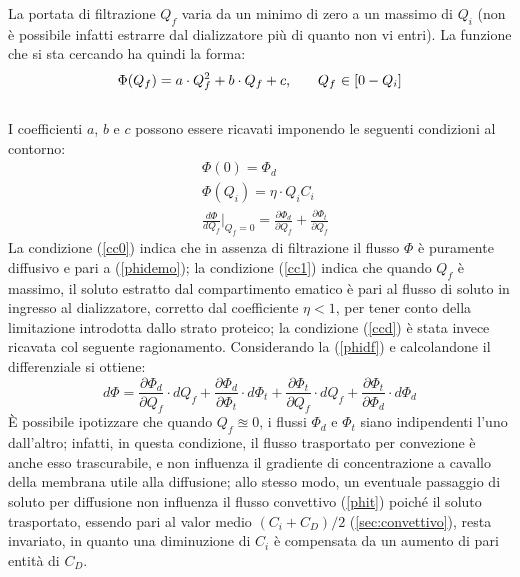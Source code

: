 La portata di filtrazione $Q_f$ varia da un minimo di zero a un massimo di $Q_i$ (non è possibile infatti estrarre dal dializzatore più di quanto non vi entri). La funzione che si sta cercando ha quindi la forma:
\begin{equation}\label{phi}
		\Phi(Q_f) = a\cdot Q_f^2 + b\cdot Q_f + c  \text{,\qquad$Q_f$ $\in[0-Q_i]$}
\end{equation}\\
I coefficienti $a$, $b$ e $c$ possono essere ricavati imponendo le seguenti condizioni al contorno:
\begin{subequations}\label{cc}
	\begin{align}
		&\Phi(0)=\Phi_d\label{cc0}\\
		&\Phi(Q_i)=\eta \cdot Q_i C_i\label{cc1}\\
		&\frac{d\Phi}{dQ_f}\Biggr\rvert_{Q_f=0}=\frac{\partial\Phi_d}{\partial Q_f} + \frac{\partial\Phi_t}{\partial Q_f}\label{ccd}
	\end{align}
\end{subequations}
La condizione (\ref{cc0}) indica che in assenza di filtrazione il flusso $\Phi$ è puramente diffusivo e pari a (\ref{phidemo}); la condizione (\ref{cc1}) indica che quando $Q_f$ è massimo, il soluto estratto dal compartimento ematico è pari al flusso di soluto in ingresso al dializzatore, corretto dal coefficiente $\eta<1$, per tener conto della limitazione introdotta dallo strato proteico; la condizione (\ref{ccd}) è stata invece ricavata col seguente ragionamento.
Considerando la (\ref{phidf}) e calcolandone il differenziale si ottiene:
\begin{equation}\label{diff}
	d\Phi = \frac{\partial \Phi_d}{\partial Q_f} \cdot dQ_f + \frac{\partial \Phi_d}{\partial \Phi_t} \cdot d\Phi_t
					+ \frac{\partial \Phi_t}{\partial Q_f} \cdot dQ_f + \frac{\partial \Phi_t}{\partial \Phi_d} \cdot d\Phi_d
\end{equation}
È possibile ipotizzare che quando $Q_f\approxeq 0$, i flussi $\Phi_d$ e $\Phi_t$ siano indipendenti l'uno dall'altro; infatti, in questa condizione, il flusso trasportato per convezione è anche esso trascurabile, e non influenza il gradiente di concentrazione a cavallo della membrana utile alla diffusione; allo stesso modo, un eventuale passaggio di soluto per diffusione non influenza il flusso convettivo (\ref{phit}) poiché il soluto trasportato, essendo pari al valor medio $(C_i+C_D)/2$ (\textsection\ref{sec:convettivo}), resta invariato, in quanto una diminuzione di $C_i$ è compensata da un aumento di pari entità di $C_D$.
